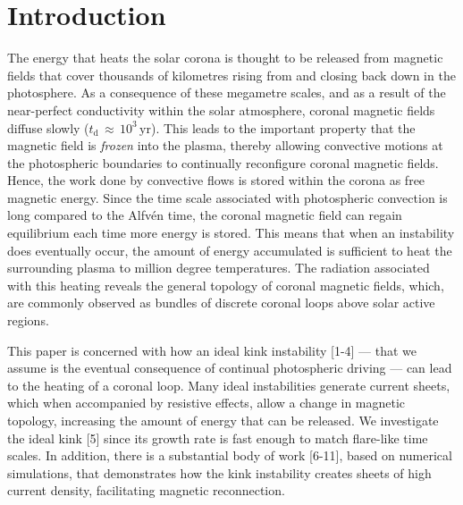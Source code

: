 \documentclass{./packages/rs/rsproca}
\begin{document}
\maketitle

\section{Introduction}
\label{sec_Introduction}

The energy that heats the solar corona is thought to be released from magnetic fields that cover thousands of kilometres rising from and closing back down in the photosphere. As a consequence of these megametre scales, and as a result of the near-perfect conductivity within the solar atmosphere, coronal magnetic fields diffuse slowly ($t_{\mathrm{d}}\,{\approx}\,10^3\,\mathrm{yr}$). This leads to the important property that the magnetic field is \textit{frozen} into the plasma, thereby allowing convective motions at the photospheric boundaries to continually reconfigure coronal magnetic fields. Hence, the work done by convective flows is stored within the corona as free magnetic energy. Since the time scale associated with photospheric convection is long compared to the Alfv\'en time, the coronal magnetic field can regain equilibrium each time more energy is stored. This means that when an instability does eventually occur, the amount of energy accumulated is sufficient to heat the surrounding plasma to million degree temperatures. The radiation associated with this heating reveals the general topology of coronal magnetic fields, which, are commonly observed as bundles of discrete coronal loops above solar active regions.

This paper is concerned with how an ideal kink instability [1-4] --- that we assume is the eventual consequence of continual photospheric driving --- can lead to the heating of a coronal loop. Many ideal instabilities generate current sheets, which when accompanied by resistive effects, allow a change in magnetic topology, increasing the amount of energy that can be released. We investigate the ideal kink [5] since its growth rate is fast enough to match flare-like time scales. In addition, there is a substantial body of work [6-11], based on numerical simulations, that demonstrates how the kink instability creates sheets of high current density, facilitating magnetic reconnection. 
\end{document}
